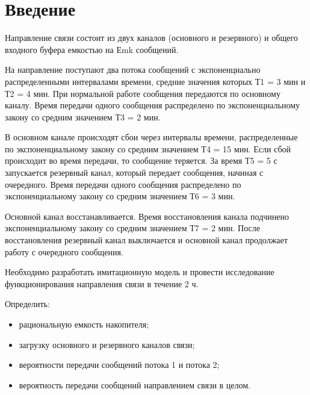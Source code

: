 \graphicspath{{./seventh/img/}} %

\section*{\LARGE Введение}
Направление связи состоит из двух каналов (основного и
резервного) и общего входного буфера емкостью на Еmk
сообщений.\par
На направление поступают два потока сообщений с
экспоненциально распределенными интервалами времени, средние
значения которых Т1 = 3 мин и Т2 = 4 мин. При нормальной
работе сообщения передаются по основному каналу. Время
передачи одного сообщения распределено по экспоненциальному
закону со средним значением Т3 = 2 мин.\par
В основном канале происходят сбои через интервалы времени,
распределенные по экспоненциальному закону со средним
значением Т4 = 15 мин. Если сбой происходит во время передачи,
то сообщение теряется. За время Т5 = 5 с запускается резервный
канал, который передает сообщения, начиная с очередного. Время
передачи одного сообщения распределено по экспоненциальному
закону со средним значением Т6 = 3 мин.\par
Основной канал восстанавливается. Время восстановления
канала подчинено экспоненциальному закону со средним
значением Т7 = 2 мин. После восстановления резервный канал
выключается и основной канал продолжает работу с очередного
сообщения.\par
Необходимо разработать имитационную модель и провести
исследование функционирования направления связи в течение 2 ч.\par
Определить:
\begin{itemize}
	\item рациональную емкость накопителя;
	\item загрузку основного и резервного каналов связи;
	\item вероятности передачи сообщений потока 1 и потока 2;
	\item вероятность передачи сообщений направлением связи в целом. 
\end{itemize}

\clearpage

